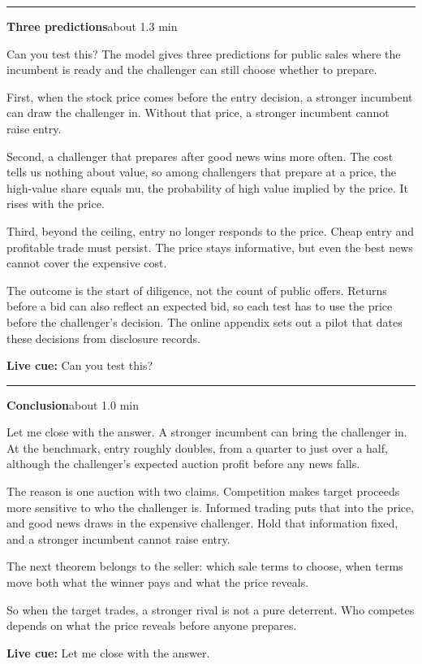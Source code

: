\documentclass[11pt]{article}
\newcommand{\Cue}[1]{\par\nobreak\smallskip\noindent
  \textcolor{ScriptGray}{\footnotesize\textbf{Live cue:} #1}\par}
\newcommand{\scriptframe}[3]{%
  \Needspace{9\baselineskip}%
  \par\medskip\noindent\textcolor{ScriptBlue}{\rule{\linewidth}{0.55pt}}%
  \par\smallskip\noindent
  \textbf{#1}\hfill\textcolor{ScriptGray}{\small #2}\par\smallskip
  #3\par}
\begin{document}
\scriptframe{Three predictions}{about 1.3 min}{%
  Can you test this? The model gives three predictions for public sales where
  the incumbent is ready and the challenger can still choose whether to
  prepare.

  First, when the stock price comes before the entry decision, a stronger
  incumbent can draw the challenger in. Without that price, a stronger
  incumbent cannot raise entry.

  Second, a challenger that prepares after good news wins more often. The cost
  tells us nothing about value, so among challengers that prepare at a price,
  the high-value share equals mu, the probability of high value implied by the
  price. It rises with the price.

  Third, beyond the ceiling, entry no longer responds to the price. Cheap entry
  and profitable trade must persist. The price stays informative, but even the
  best news cannot cover the expensive cost.

  The outcome is the start of diligence, not the count of public offers.
  Returns before a bid can also reflect an expected bid, so each test has to
  use the price before the challenger's decision. The online appendix sets out a pilot
  that dates these decisions from disclosure records.
  \Cue{Can you test this?}
}

\begin{samepage}
\scriptframe{Conclusion}{about 1.0 min}{%
  Let me close with the answer. A stronger incumbent can bring the challenger
  in. At the benchmark, entry roughly doubles, from a quarter to just over a
  half, although the challenger's expected auction profit before any news
  falls.

  The reason is one auction with two claims. Competition makes target proceeds
  more sensitive to who the challenger is. Informed trading puts that into the
  price, and good news draws in the expensive challenger. Hold that
  information fixed, and a stronger incumbent cannot raise entry.

  The next theorem belongs to the seller: which sale terms to choose, when terms
  move both what the winner pays and what the price reveals.

  So when the target trades, a stronger rival is not a pure deterrent. Who
  competes depends on what the price reveals before anyone prepares.
  \Cue{Let me close with the answer.}
}
\end{samepage}
\end{document}
